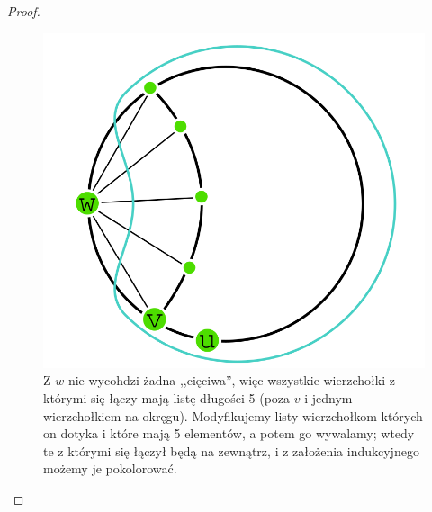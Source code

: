 \begin{proof}
	\begin{figure}[H]
		\centering
		\includegraphics[scale=0.4]{images/5w2.png}
		\caption{Z $w$ nie wycohdzi żadna ,,cięciwa'', więc wszystkie wierzchołki z którymi się łączy mają listę długości 5 (poza $v$ i jednym wierzchołkiem na okręgu). Modyfikujemy listy wierzchołkom których on dotyka i które mają 5 elementów, a potem go wywalamy; wtedy te z którymi się łączył będą na zewnątrz, i z założenia indukcyjnego możemy je pokolorować. }
	\end{figure}
\end{proof}